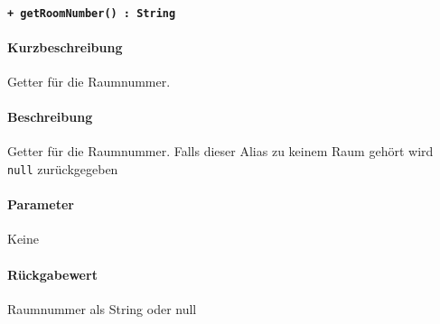 \paragraph{\texttt{+ getRoomNumber() : String}}\label{AP_Alias_getRoomNumber}%
\paragraph*{Kurzbeschreibung}
Getter für die Raumnummer.
\paragraph*{Beschreibung}
Getter für die Raumnummer.
Falls dieser Alias zu keinem Raum gehört wird \verb#null# zurückgegeben
\paragraph*{Parameter}
Keine
\paragraph*{Rückgabewert}
Raumnummer als String oder null